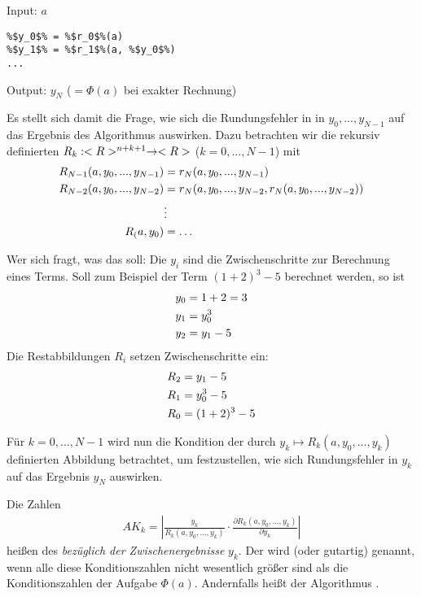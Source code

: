 \begin{algorithm}
	Input: $a$
	\begin{lstlisting}
%$y_0$% = %$r_0$%(a)
%$y_1$% = %$r_1$%(a, %$y_0$%)
...
	\end{lstlisting}
	Output: $y_N$ ($=\Phi(a)$ bei exakter Rechnung)
\end{algorithm}

Es stellt sich damit die Frage, wie sich die Rundungsfehler in in $y_0,...,y_{N-1}$ auf das Ergebnis des Algorithmus auswirken. Dazu betrachten wir die rekursiv definierten  $R_k:<R>^{n+k+1}\to<R>$ ($k=0,...,N-1$) mit
\begin{align}
	R_{N-1}(a,y_0,...,y_{N-1}) &= r_N(a,y_0,...,y_{N-1}) \notag \\
	R_{N-2}(a,y_0,...,y_{N-2}) &= r_N(a,y_0,...,y_{N-2},r_N(a,y_0,...,y_{N-2})) \notag \\
	&\vdots \notag \\
	R_(a,y_0) &= \dots \notag
\end{align}

\begin{*anmerkung}
	Wer sich fragt, was das soll: Die $y_i$ sind die Zwischenschritte zur Berechnung eines Terms. Soll zum Beispiel der Term $(1+2)^3-5$ berechnet werden, so ist
	\begin{align}
		y_0 &= 1+2 = 3 \notag \\
		y_1 &= y_0^3 \notag \\
		y_2 &= y_1-5 \notag
	\end{align}
	Die Restabbildungen $R_i$ setzen Zwischenschritte ein:
	\begin{align}
		R_2 &= y_1 -5\notag \\
		R_1 &= y_0^3 -5 \notag \\
		R_0 &= (1+2)^3 - 5\notag
	\end{align}
\end{*anmerkung}

Für $k=0,...,N-1$ wird nun die Kondition der durch $y_k\mapsto R_k(a,y_0,...,y_k)$ definierten Abbildung betrachtet, um festzustellen, wie sich Rundungsfehler in $y_k$ auf das Ergebnis $y_N$ auswirken.

\begin{definition}
	Die Zahlen
	\begin{align}
		AK_k = \left|\frac{y_k}{R_k(a,y_0,...,y_k)}\cdot\frac{\partial R_k(a,y_0,...,y_k)}{\partial y_k}\right|
	\end{align}
	heißen  des  \emph{bezüglich der Zwischenergebnisse} $y_k$. Der  wird  (oder gutartig) genannt, wenn alle diese Konditionszahlen nicht wesentlich größer sind als die Konditionszahlen der Aufgabe $\Phi(a)$. Andernfalls heißt der Algorithmus .
\end{definition}

